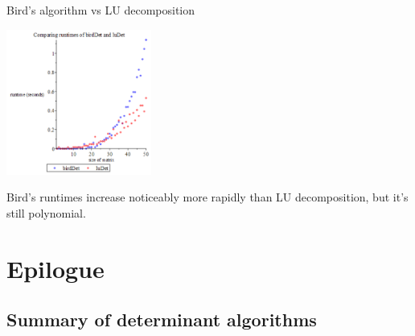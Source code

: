 \documentclass[handout]{beamer}
\begin{document}
\begin{frame}{Bird's algorithm vs LU decomposition}

    \begin{center}{}
        \includegraphics[height=180]{bird-lu}
    \end{center}

    Bird's runtimes increase noticeably more rapidly than LU decomposition,
    but it's still polynomial.

\end{frame}

\section{Epilogue}

\subsection{Summary of determinant algorithms}
\end{document}
